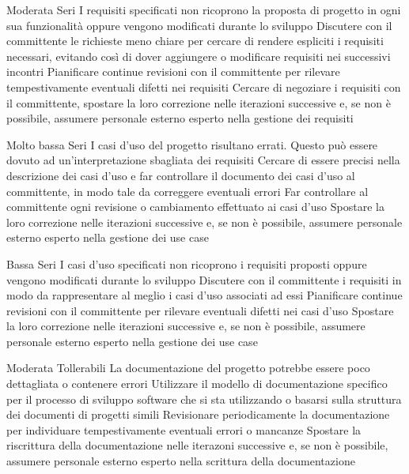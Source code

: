 {Moderata}
{Seri}
{I requisiti specificati non ricoprono la proposta di progetto in ogni sua funzionalità oppure vengono modificati durante lo sviluppo}
{Discutere con il committente le richieste meno chiare per cercare di rendere espliciti i requisiti necessari, evitando così di dover aggiungere o modificare requisiti nei successivi incontri}
{Pianificare continue revisioni con il committente per rilevare tempestivamente eventuali difetti nei requisiti}
{Cercare di negoziare i requisiti con il committente, spostare la loro correzione nelle iterazioni successive e, se non è possibile, assumere personale esterno esperto nella gestione dei requisiti}


{Molto bassa}
{Seri}
{I casi d'uso del progetto risultano errati. Questo può essere dovuto ad un'interpretazione sbagliata dei requisiti}
{Cercare di essere precisi nella descrizione dei casi d'uso e far controllare il documento dei casi d'uso al committente, in modo tale da correggere eventuali errori}
{Far controllare al committente ogni revisione o cambiamento effettuato ai casi d'uso}
{Spostare la loro correzione nelle iterazioni successive e, se non è possibile, assumere personale esterno esperto nella gestione dei use case}


{Bassa}
{Seri}
{I casi d'uso specificati non ricoprono i requisiti proposti oppure vengono modificati durante lo sviluppo}
{Discutere con il committente i requisiti in modo da rappresentare al meglio i casi d'uso associati ad essi}
{Pianificare continue revisioni con il committente per rilevare eventuali difetti nei casi d'uso}
{Spostare la loro correzione nelle iterazioni successive e, se non è possibile, assumere personale esterno esperto nella gestione dei use case}


{Moderata}
{Tollerabili}
{La documentazione del progetto potrebbe essere poco dettagliata o contenere errori}
{Utilizzare il modello di documentazione specifico per il processo di sviluppo software che si sta utilizzando o basarsi sulla struttura dei documenti di progetti simili}
{Revisionare periodicamente la documentazione per individuare tempestivamente eventuali errori o mancanze}
{Spostare la riscrittura della documentazione nelle iterazoni successive e, se non è possibile, assumere personale esterno esperto nella scrittura della documentazione}

